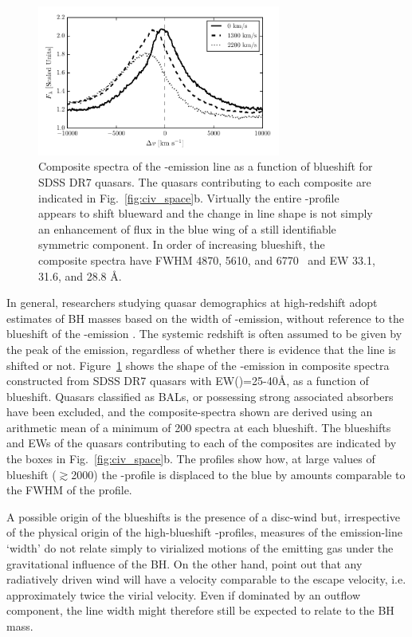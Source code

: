\begin{figure}
    \includegraphics[width=8cm]{figures/chapter02/civ_composites.pdf}
    \caption{Composite spectra of the -emission line as a function of  blueshift for SDSS DR7 quasars. The quasars contributing to each composite are indicated in Fig.~\ref{fig:civ_space}b. Virtually the entire -profile appears to shift blueward and the change in line shape is not simply an enhancement of flux in the blue wing of a still identifiable symmetric component. In order of increasing  blueshift, the composite spectra have FWHM 4870, 5610, and 6770 \kms\, and EW 33.1, 31.6, and 28.8 \AA.}
    \label{fig:civ_composites}
\end{figure}

In general, researchers studying quasar demographics at high-redshift adopt estimates of BH masses based on the width of -emission, without reference to the blueshift of the -emission \citep[e.g.][]{vestergaard04,kollmeier06,gavignaud08,vestergaard08,vestergaard09,kelly10,kelly13}.  
The systemic redshift is often assumed to be given by the peak of the  emission, regardless of whether there is evidence that the line is shifted or not.
Figure~\ref{fig:civ_composites} shows the shape of the -emission in composite spectra constructed from SDSS DR7 quasars with EW()=25-40\AA, as a function of  blueshift. 
Quasars classified as BALs, or possessing strong associated absorbers have been excluded, and the composite-spectra shown are derived using an arithmetic mean of a minimum of 200 spectra at each blueshift. 
The blueshifts and EWs of the quasars contributing to each of the composites are indicated by the boxes in Fig.~\ref{fig:civ_space}b.  
The profiles show how, at large values of blueshift ($\gtrsim$2000\kms) the -profile is displaced to the blue by amounts comparable to the FWHM of the profile.

A possible origin of the blueshifts is the presence of a disc-wind \citep[see][for recent papers]{gallagher15, higginbottom15} but, irrespective of the physical origin of the high-blueshift -profiles, measures of the emission-line `width' do not relate simply to virialized motions of the emitting gas under the gravitational influence of the BH. 
On the other hand, \citet{denney13} point out that any radiatively driven wind will have a velocity comparable to the escape velocity, i.e. approximately twice the virial velocity.
Even if dominated by an outflow component, the  line width might therefore still be expected to relate to the BH mass. 



